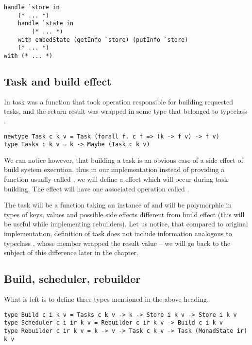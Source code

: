 \begin{lstlisting}[language=Haleff, float=h, title={Usage example of \helinl{embedState}}]
handle `store in
    (* ... *)
    handle `state in
        (* ... *)
    with embedState (getInfo `store) (putInfo `store)
    (* ... *)
with (* ... *)
\end{lstlisting}

\subsection{Task and build effect}

In \BSaLC{} task was a function that took operation responsible for building requested tasks, and the return result was wrapped in some type  that belonged to typeclass .

\begin{lstlisting}[style=haskell-style]
newtype Task c k v = Task (forall f. c f => (k -> f v) -> f v)
type Tasks c k v = k -> Maybe (Task c k v)
\end{lstlisting}

We can notice however, that building a task is an obvious case of a side effect of build system execution, thus in our implementation instead of providing a function usually called , we will define a  effect which will occur during task building. The effect will have one associated operation called .



The task will be a function taking an instance of  and will be polymorphic in types of keys, values and possible side effects different from build effect (this will be useful while implementing rebuilders). Let us notice, that compared to original implementation, definition of task does not include information analogous to typeclass , whose member  wrapped the result value -- we will go back to the subject of this difference later in the chapter.

\subsection{Build, scheduler, rebuilder}

What is left is to define three types mentioned in the above heading.

\begin{lstlisting}[style=haskell-style]
type Build c i k v = Tasks c k v -> k -> Store i k v -> Store i k v
type Scheduler c i ir k v = Rebuilder c ir k v -> Build c i k v
type Rebuilder c ir k v = k -> v -> Task c k v -> Task (MonadState ir) k v
\end{lstlisting}


